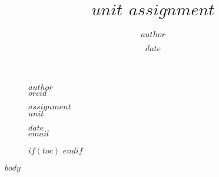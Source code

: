 \documentclass[10pt, a4paper, fleqn]{article}
\title{$unit$ $assignment$}
\date{$date$}
\author{$author$}
\begin{document}
	\thispagestyle{plain}
	\begin{figure}[!t]
		\begin{minipage}{0.295\textwidth} %
			\raggedright
			$author$ %
			\\
			\footnotesize
			$orcid$ %
		\end{minipage}
		\begin{minipage}{0.4\textwidth} %
			\centering
			\Huge %
			$assignment$ %
			\\
			\Large %
			$unit$ %
		\end{minipage}
		\begin{minipage}{0.295\textwidth} %
			\raggedleft
			$date$ %
			\\
			\footnotesize %
			\href{mailto:$email$}{$email$}%
		\end{minipage}
		$if(toc)$
			$endif$
	\end{figure}
	$body$
\end{document}
